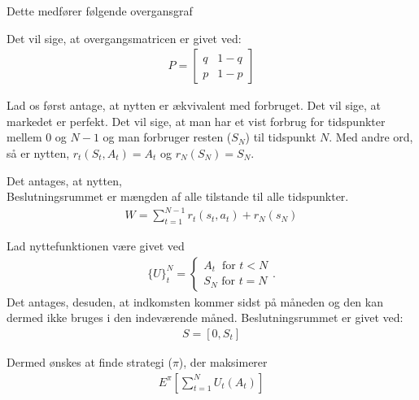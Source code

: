 Dette medfører følgende overgansgraf\\

Det vil sige, at overgangsmatricen er givet ved:\\
\begin{align*}
    P=\begin{bmatrix}q & 1-q\\ p & 1-p\end{bmatrix}
\end{align*}

Lad os først antage, at nytten er ækvivalent med forbruget. Det vil sige, at markedet er perfekt. Det vil sige, at man har et vist forbrug for tidspunkter mellem 0 og $N-1$ og man forbruger resten ($S_N$) til tidspunkt $N$. Med andre ord, så er nytten, $r_t(S_t,A_t)=A_t$ og $r_N(S_N)=S_N$.

Det antages, at nytten, \\
Beslutningsrummet er mængden af alle tilstande til alle tidspunkter. 
\begin{align*}
    W=\sum_{t=1}^{N-1} r_t(s_t,a_t)+ r_N(s_N)
\end{align*}

Lad nyttefunktionen være givet ved
\begin{align*}
    \{U\}_t^N=\begin{cases}A_t\ \text{ for } t<N\\ S_N \text{ for } t=N \end{cases}.
\end{align*}
Det antages, desuden, at indkomsten kommer sidst på måneden og den kan dermed ikke bruges i den indeværende måned. Beslutningsrummet er givet ved:
\begin{align*}
    S=[0,S_t]
\end{align*}

Dermed ønskes at finde strategi ($\pi$), der maksimerer
\begin{align*}
    E^\pi \left[\sum_{t=1}^N U_t(A_t)\right]
\end{align*}

